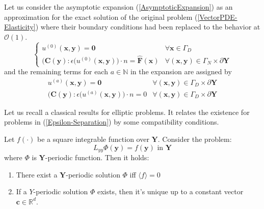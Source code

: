 Let us consider the asymptotic expansion (\ref{AsymptoticExpansion}) as an approximation for the exact solution of the original problem (\ref{VectorPDE-Elasticity}) where their boundary conditions had been replaced to the behavior at $\mathcal{O}(1)$.
\begin{equation*}
    \left \{
    \begin{array}{cc}   
        u^{(0)}(\mathbf{x},\mathbf{y}) = \mathbf{0} & \forall \mathbf{x} \in \Gamma_D\\
        \big(\mathbf{C}(\mathbf{y}): \epsilon (u^{(0)}(\mathbf{x}, \mathbf{y}) \big) \cdot n = \hat{\mathbf{F}}(\mathbf{x}) & \forall (\mathbf{x},\mathbf{y}) \in \Gamma_N \times \partial \mathbf{Y}
    \end{array}
    \right .
\end{equation*}
and the remaining terms for each $a \in \mathbb{N}$ in the expansion are assigned by
\begin{equation*}
    \begin{array}{cc}
        u^{(a)}(\mathbf{x},\mathbf{y}) = \mathbf{0} & \forall (\mathbf{x}, \mathbf{y}) \in \Gamma_D\times \partial \mathbf{Y} \\
        \big( \mathbf{C}(\mathbf{y}): \epsilon(u^{(a)}(\mathbf{x},\mathbf{y}) \big) \cdot n = 0 & \forall  (\mathbf{x}, \mathbf{y}) \in \Gamma_D\times \partial \mathbf{Y} 
    \end{array}
\end{equation*}

Let us recall a classical results for elliptic problems. It relates the existence for problems in (\ref{Epsilon-Separation}) by some compatibility conditions.
\begin{lem}
\label{ExistenceLemma}
Let $f(\cdot)$ be a square integrable function over $\mathbf{Y}$. Consider the problem:
\begin{equation*}
    L_{yy} \Phi(\mathbf{y}) = f(\mathbf{y}) \text{ in } \mathbf{Y}
\end{equation*}
where $\Phi$ is $\mathbf{Y}$-periodic function. Then it holds:
\begin{enumerate}
    \item There exist a $\mathbf{Y}$-periodic solution $\Phi$ iff $\langle f \rangle = 0$
    \item If a $Y$-periodic solution $\Phi$ exists, then it's unique up to a constant vector $\mathbf{c} \in \mathbb{R}^d$.
\end{enumerate}
\end{lem}

